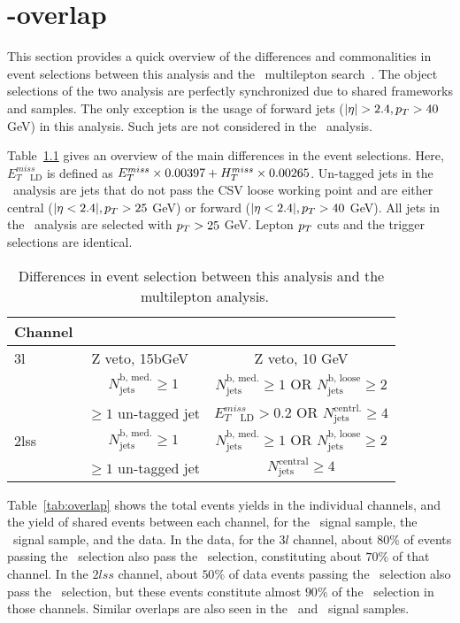 \chapter{\tHq-\ttH overlap}\label{app:overlap}
This section provides a quick overview of the differences and commonalities in event selections between this analysis and the \ttH\ multilepton search~\cite{CMS_AN_2017-029}. The object selections of the two analysis are perfectly synchronized due to shared frameworks and samples. The only exception is the usage of forward jets ($|\eta|>2.4, \pt>40$ GeV) in this analysis. Such jets are not considered in the \ttH\ analysis.

Table~\ref{tab:seldiffs} gives an overview of the main differences in the event selections. Here, $E^{miss}_{T\quad\text{LD}}$ is defined as $E_T^{miss}\times0.00397 + H_{T}^{miss}\times0.00265$. Un-tagged jets in the \tHq\ analysis are jets that do not pass the CSV loose working point and are either central ($|\eta<2.4|, p_T>25$ GeV) or forward ($|\eta<2.4|, p_T>40$ GeV). All jets in the \ttH\ analysis are selected with $p_T>25$ GeV. Lepton $p_T$ cuts and the trigger selections are identical.

\begin{table}[h!]
\centering
\begin{tabular}{l|cc}
	Channel & \tHq & \ttH \\ \hline
	3l   & Z veto, 15bGeV\ & Z veto, 10 GeV\\\ 
	     & $N_\text{jets}^\text{b, med.}\geq1$ &
	       $N_\text{jets}^\text{b, med.}\geq1$ OR
	       $N_\text{jets}^\text{b, loose}\geq2$ \\\ 
	     & $\geq1$ un-tagged jet & $E^{miss}_{T\quad\text{LD}}> 0.2$ OR $N_\text{jets}^\text{centrl.}\geq4$ \\ \hline
	2lss & $N_\text{jets}^\text{b, med.}\geq1$ &
	       $N_\text{jets}^\text{b, med.}\geq1$ OR
	       $N_\text{jets}^\text{b, loose}\geq2$ \\\ 
	     & $\geq1$ un-tagged jet & $N_\text{jets}^\text{central}\geq4$ \\
\end{tabular}
\caption{Differences in event selection between this analysis and the \ttH\ multilepton analysis.}\label{tab:seldiffs}
\end{table}

Table~\ref{tab:overlap} shows the total events yields in the individual channels, and the yield of shared events between each channel, for the \tHq\ signal sample, the \ttH\ signal sample, and the data.
In the data, for the $3l$ channel, about $80\%$ of events passing the \tHq\ selection also pass the \ttH\ selection, constituting about $70\%$ of that channel. In the $2lss$ channel, about $50\%$ of data events passing the \tHq\ selection also pass the \ttH\ selection, but these events constitute almost $90\%$ of the \ttH\ selection in those channels. Similar overlaps are also seen in the \tHq\ and \ttH\ signal samples.

